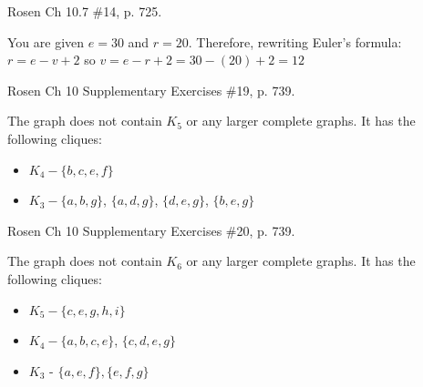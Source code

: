 \begin{questions}
\begin{solution}
\begin{enumerate}[label=(\alph*),itemsep=0pt,parsep=0pt,topsep=0pt,partopsep=0pt]
    \end{enumerate}

  \end{solution}



  \ifprintanswers
        \vspace{-10pt}
  \fi
{} Rosen Ch 10.7 \#14, p. 725. 
  \ifprintanswers
        \vspace{-10pt}
  \fi
  \begin{solution}
    You are given $e = 30$ and $r = 20$. Therefore, rewriting Euler's formula: 
      $r = e - v + 2$ so $v = e - r + 2 = 30 - (20) + 2 = 12$
  \end{solution}



  \ifprintanswers
        \vspace{-10pt}
  \fi
{} Rosen Ch 10 Supplementary Exercises \#19, p. 739. 
  \ifprintanswers
        \vspace{-10pt}
  \fi
  \begin{solution}
    The graph does not contain $K_5$ or any larger complete graphs.  It has the following cliques: 
    \begin{itemize}[itemsep=0pt,parsep=0pt,topsep=0pt,partopsep=0pt]
      \item $K_4 - \{b, c, e, f\}$ 
      \item $K_3 - \{a, b, g\}$, $\{a, d, g \}$, $\{d, e, g\}$, $\{b, e, g\}$
    \end{itemize}
  \end{solution}



  \ifprintanswers
        \vspace{-10pt}
  \fi
{} Rosen Ch 10 Supplementary Exercises \#20, p. 739. 
  \ifprintanswers
        \vspace{-10pt}
  \fi
  \begin{solution}
  The graph does not contain $K_6$ or any larger complete graphs. It has the following cliques: 
  \begin{itemize}[itemsep=0pt,parsep=0pt,topsep=0pt,partopsep=0pt]
    \item $K_5 -  \{c, e, g, h, i\}$
    \item $K_4 -  \{a, b, c, e\}$, $\{c, d, e, g\}$
    \item $K_3$ - $\{a,e,f\}, \{e, f, g\}$
  \end{itemize}
  \end{solution}



\end{questions}
